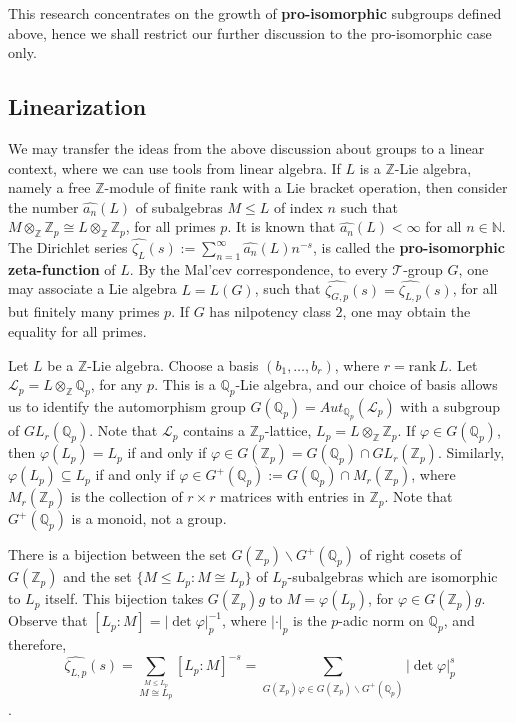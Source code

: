 \documentclass[12pt]{article}
\begin{document}
This research concentrates on the growth of \textbf{pro-isomorphic} subgroups defined above, hence we shall restrict our further discussion to the pro-isomorphic case only.
\subsection{Linearization}
We may transfer the ideas from the above discussion about groups to a linear context, where we can use tools from linear algebra.
If $L$ is a $\mathbb{Z}$-Lie algebra, namely a free $\mathbb{Z}$-module of finite rank with a Lie bracket operation, then consider the number $\hat{a_n}(L)$ of subalgebras $M\leq L$ of index $n$ such that $M\otimes_{\mathbb{Z}}\mathbb{Z}_p\cong L\otimes_{\mathbb{Z}}\mathbb{Z}_p$, for all primes $p$. It is known that $\hat{a_n}(L)<\infty$ for all $n\in\mathbb{N}$. The Dirichlet series $\hat{\zeta_L}(s):=\sum_{n=1}^{\infty}\hat{a_n}(L)n^{-s}$, is called the \textbf{pro-isomorphic zeta-function} of $L$. By the Mal'cev correspondence, to every $\mathcal{T}$-group $G$, one may associate a Lie algebra $L=L(G)$, such that $\hat{\zeta_{G,p}}(s)=\hat{\zeta_{L,p}}(s)$, for all but finitely many primes $p$. If $G$ has nilpotency class $2$, one may obtain the equality for all primes.\par
Let $L$ be a $\mathbb{Z}$-Lie algebra. Choose a basis $(b_1,\dots,b_r)$, where $r=\mathrm{rank}\,L$. Let $\mathcal{L}_{p}=L\otimes_{\mathbb{Z}}\mathbb{Q}_p$, for any $p$. This is a $\mathbb{Q}_p$-Lie algebra, and our choice of basis allows us to identify the automorphism group $G(\mathbb{Q}_p)=Aut_{\mathbb{Q}_p}(\mathcal{L}_{p})$ with a subgroup of $GL_r(\mathbb{Q}_p)$. Note that $\mathcal{L}_{p}$ contains a $\mathbb{Z}_p$-lattice, $L_{p}=L\otimes_{\mathbb{Z}}\mathbb{Z}_p$. If $\varphi\in G(\mathbb{Q}_p)$, then $\varphi(L_{p})=L_{p}$ if and only if $\varphi\in G(\mathbb{Z}_p)=G(\mathbb{Q}_p)\cap GL_r(\mathbb{Z}_p)$. Similarly, $\varphi(L_{p})\subseteq L_{p}$ if and only if $\varphi\in G^+(\mathbb{Q}_p):=G(\mathbb{Q}_p)\cap {M}_r(\mathbb{Z}_p)$, where ${M}_r(\mathbb{Z}_p)$ is the collection of $r\times r$ matrices with entries in $\mathbb{Z}_p$. Note that $G^+(\mathbb{Q}_p)$ is a monoid, not a group.\par
There is a bijection between the set $G(\mathbb{Z}_p)\backslash G^+(\mathbb{Q}_p)$ of right cosets of $G(\mathbb{Z}_p)$ and the set $\{M\leq L_{p} : M\cong L_{p}\}$ of $L_{p}$-subalgebras which are isomorphic to $L_{p}$ itself. This bijection takes $G(\mathbb{Z}_p)g$ to $M=\varphi(L_{p})$, for $\varphi\in G(\mathbb{Z}_p)g$.
Observe that $[L_{p}:M]=|\det\varphi|_p^{-1}$, where $|\cdot|_p$ is the $p$-adic norm on $\mathbb{Q}_{p}$, and therefore,
\begin{equation}
\label{equation.proisomorphic.zeta}
\hat{\zeta_{L,p}}(s)=\underset{\overset{\scriptscriptstyle M\leq L_{p}}{\scriptscriptstyle M\cong L_{p}}}{\sum}[L_{p}:M]^{-s}=\underset{\scriptscriptstyle G(\mathbb{Z}_p)\varphi\in G(\mathbb{Z}_p)\backslash G^+(\mathbb{Q}_p)}{\sum}|\det\varphi|_p^s
\end{equation}.
\end{document}
